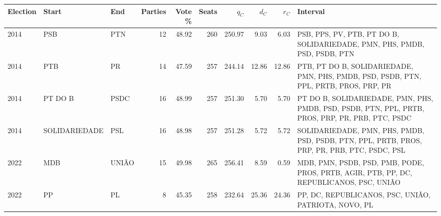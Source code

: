 \begin{tabularx}{\textwidth}{@{}lllrrrrrr>{\raggedright\arraybackslash}X@{}}
\toprule
Election & Start & End & Parties & Vote \% & Seats & \(q_C\) & \(d_C\) & \(r_C\) & Interval \\
\midrule
2014 & PSB & PTN & 12 & 48.92 & 260 & 250.97 & 9.03 & 6.03 & PSB, PPS, PV, PTB, PT DO B, SOLIDARIEDADE, PMN, PHS, PMDB, PSD, PSDB, PTN \\
2014 & PTB & PR & 14 & 47.59 & 257 & 244.14 & 12.86 & 12.86 & PTB, PT DO B, SOLIDARIEDADE, PMN, PHS, PMDB, PSD, PSDB, PTN, PPL, PRTB, PROS, PRP, PR \\
2014 & PT DO B & PSDC & 16 & 48.99 & 257 & 251.30 & 5.70 & 5.70 & PT DO B, SOLIDARIEDADE, PMN, PHS, PMDB, PSD, PSDB, PTN, PPL, PRTB, PROS, PRP, PR, PRB, PTC, PSDC \\
2014 & SOLIDARIEDADE & PSL & 16 & 48.98 & 257 & 251.28 & 5.72 & 5.72 & SOLIDARIEDADE, PMN, PHS, PMDB, PSD, PSDB, PTN, PPL, PRTB, PROS, PRP, PR, PRB, PTC, PSDC, PSL \\
2022 & MDB & UNIÃO & 15 & 49.98 & 265 & 256.41 & 8.59 & 0.59 & MDB, PMN, PSDB, PSD, PMB, PODE, PROS, PRTB, AGIR, PTB, PP, DC, REPUBLICANOS, PSC, UNIÃO \\
2022 & PP & PL & 8 & 45.35 & 258 & 232.64 & 25.36 & 24.36 & PP, DC, REPUBLICANOS, PSC, UNIÃO, PATRIOTA, NOVO, PL \\
\bottomrule
\end{tabularx}
